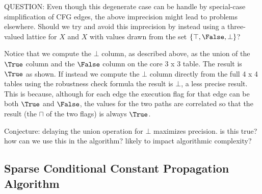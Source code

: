 {\begin{enumerate}
QUESTION: Even though this degenerate case can be handle by special-case
simplification of CFG edges, the above imprecision might lead to problems
elsewhere.  Should we try and avoid this
imprecision by instead using a three-valued lattice for $X$ and $X$
with values drawn from the set $\{ \top, \False, \bot \}$?

Notice that we compute the $\bot$ column, as described above, as the
union of the $\True$ column and the $\False$ column on the core 3 x 3
table. The result is $\True$ as shown. If instead we compute the $\bot$
column directly from the full 4 x 4 tables using the robustness check
formula the result is $\bot$, a less precise result. This is because,
although for each edge the execution flag for that edge can be both
$\True$ and $\False$, the values for the two paths are correlated so
that the result (the $\sqcap$ of the two flags) is always $\True$. 

Conjecture: delaying the union operation for $\bot$ maximizes precision.
is this true? how can we use this in the algorithm? likely to impact
algorithmic complexity?

\end{enumerate}
}




\subsection{Sparse Conditional Constant Propagation Algorithm}\label{sec:scc:alg}


